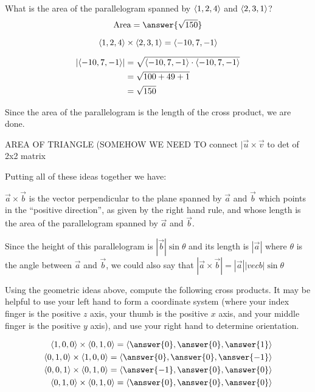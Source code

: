 \documentclass{ximera}
\begin{document}
\begin{question}
  What is the area of the parallelogram spanned by $\left\langle 1,2,4\right\rangle$ and $\left\langle 2,3,1\right\rangle$?
  \[
  \textrm{Area} = \answer{\sqrt{150}}
  \]
  
  \begin{hint}
    \[
    \left\langle 1,2,4\right\rangle \times \left\langle 2,3,1\right\rangle = \left\langle -10,7,-1\right\rangle
    \]
  \end{hint}
  
  
  \begin{hint}
    \begin{align*}
      \left| \left\langle -10,7,-1\right\rangle \right| &= \sqrt{ \left\langle -10,7,-1\right\rangle \cdot  \left\langle -10,7,-1\right\rangle}\\
      &=\sqrt{100+49+1}\\
      &=\sqrt{150}
    \end{align*}
    
    Since the area of the parallelogram is the length of the cross product, we are done.
  \end{hint}
\end{question}

AREA OF TRIANGLE (SOMEHOW WE NEED TO connect $|\vec{u}\times\vec{v}$  to det of 2x2 matrix



Putting all of these ideas together we have:

\begin{theorem}
  $\vec{a} \times \vec{b}$ is the vector perpendicular to the plane
  spanned by $\vec{a}$ and $\vec{b}$ which points in the ``positive
  direction'', as given by the right hand rule, and whose length is
  the area of the parallelogram spanned by $\vec{a}$ and $\vec{b}$.
\end{theorem}

\begin{observation}
  Since the height of this parallelogram is $|\vec{b}| \sin\theta$ and
  its length is $|\vec{a}|$ where $\theta$ is the angle between
  $\vec{a}$ and $\vec{b}$, we could also say that $|\vec{a} \times
  \vec{b}| = |\vec{a}||vec{b}| \sin\theta$
\end{observation}

\begin{question}
  Using the geometric ideas above, compute the following cross
  products.  It may be helpful to use your left hand to form a
  coordinate system (where your index finger is the positive $z$ axis,
  your thumb is the positive $x$ axis, and your middle finger is the
  positive $y$ axis), and use your right hand to determine
  orientation.
  
  \begin{align*}
    \vector{1,0,0} \times \vector{0,1,0} = \vector{\answer{0},\answer{0},\answer{1}}\\
    \vector{0,1,0} \times \vector{1,0,0} = \vector{\answer{0},\answer{0},\answer{-1}}\\
    \vector{0,0,1} \times \vector{0,1,0} = \vector{\answer{-1},\answer{0},\answer{0}}\\
    \vector{0,1,0} \times \vector{0,1,0} = \vector{\answer{0},\answer{0},\answer{0}}\\
  \end{align*}
\end{question}
\end{document}
